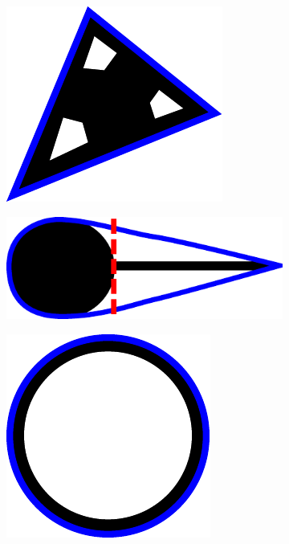 \begin{figure}[p]
\begin{subfigure}[b]{0.3\linewidth}
	  \label{fig:image_roundedcorners}
	\end{subfigure}
	\centering
	\begin{subfigure}[b]{0.3\linewidth}
	  \centering
	  \includegraphics[scale=0.5]{convexhullimages/image_ok.pdf}
	  \label{fig:image_ok}
	\end{subfigure}
	\centering
	\begin{subfigure}[b]{0.3\linewidth}
	  \centering
	  \includegraphics[scale=0.5]{convexhullimages/image_singlesplit.pdf}
	  \label{fig:image_singlesplit}
	\end{subfigure}
	\centering
	\begin{subfigure}[b]{0.3\linewidth}
	  \centering
	  \includegraphics[scale=0.5]{convexhullimages/image_ring.pdf}

\end{subfigure}
\end{figure}
